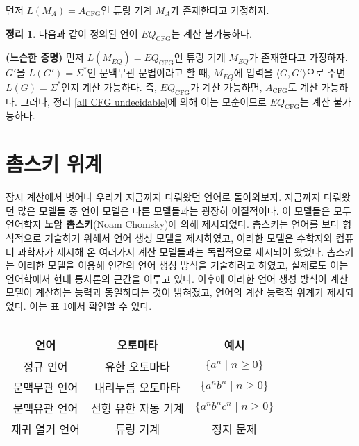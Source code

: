 \documentclass[b5paper, 11pt]{book}
\theoremstyle{definition}
\newtheorem{thm}[defn]{정리}
\newenvironment{pf*}{\pushQED{\qed}\pf}
{\popQED\endpf}
\begin{document}
\begin{pf*}
    먼저 $L(M_A) = A_\text{CFG}$인 튜링 기계 $M_A$가 존재한다고 가정하자. 
\end{pf*}
\begin{thm}
    다음과 같이 정의된 언어 $EQ_\text{CFG}$는 계산 불가능하다.
\end{thm}
\begin{pf*}
    \textbf{(느슨한 증명)}
    먼저 $L(M_{EQ}) = EQ_\text{CFG}$인 튜링 기계 $M_{EQ}$가 존재한다고 가정하자. $G'$을 $L(G') = \Sigma^*$인 문맥무관 문법이라고 할 때, $M_{EQ}$에 입력을 $\langle G, G' \rangle$으로 주면 $L(G) = \Sigma^*$인지 계산 가능하다. 즉, $EQ_\text{CFG}$가 계산 가능하면, $A_\text{CFG}$도 계산 가능하다. 그러나, 정리 \ref{all CFG undecidable}에 의해 이는 모순이므로 $EQ_\text{CFG}$는 계산 불가능하다.
\end{pf*}
\section{촘스키 위계}
잠시 계산에서 벗어나 우리가 지금까지 다뤄왔던 언어로 돌아와보자. 지금까지 다뤄왔던 많은 모델들 중
언어 모델은 다른 모델들과는 굉장히 이질적이다. 이 모델들은 모두 
언어학자 \textbf{노암 촘스키}(Noam Chomsky)에 의해 제시되었다. 촘스키는 언어를 보다 형식적으로
기술하기 위해서 언어 생성 모델을 제시하였고, 이러한 모델은 수학자와 컴퓨터 과학자가 제시해 온 여러가지 계산 모델들과는 독립적으로 제시되어 왔었다. 촘스키는 이러한 모델을 이용해 인간의 언어 생성 방식을 기술하려고 하였고, 실제로도 이는 언어학에서 현대 통사론의 근간을 이루고 있다. 이후에 이러한 언어 생성 방식이 계산 모델이 계산하는 능력과 동일하다는 것이 밝혀졌고, 언어의 계산 능력적 위계가 제시되었다. 이는 표 \ref{chomsky hierarchy}에서 확인할 수 있다.
\begin{table}[h]
    \centering
    \begin{tabular}{|c|c|c|}
    \hline
    \textbf{언어} & \textbf{오토마타} & \textbf{예시} \\ \hline
    정규 언어       & 유한 오토마타       &   $\{ a^n \;\vert\; n\ge 0\}$    \\ \hline
    문맥무관 언어    & 내리누름 오토마타     & $\{ a^n b^n \;\vert\; n\ge 0\}$    \\ \hline
    문맥유관 언어    & 선형 유한 자동 기계   & $\{ a^n b^n c^n \;\vert\; n\ge 0\}$    \\ \hline
    재귀 열거 언어    & 튜링 기계         & 정지 문제  \\ \hline
    \end{tabular}
    \caption{}
    \label{chomsky hierarchy}
\end{table}
\end{document}
